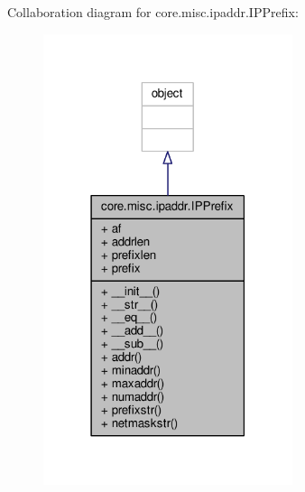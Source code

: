 Collaboration diagram for core.\+misc.\+ipaddr.\+I\+P\+Prefix\+:
\nopagebreak
\begin{figure}[H]
\begin{center}
\leavevmode
\includegraphics[width=207pt]{classcore_1_1misc_1_1ipaddr_1_1_i_p_prefix__coll__graph}
\end{center}
\end{figure}
